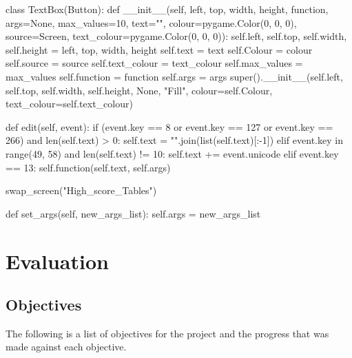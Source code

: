 \documentclass[fleqn]{article}
\begin{document}
\begin{python}
class TextBox(Button):
    def __init__(self, left, top, width, height, function, args=None, max_values=10, text="",
                 colour=pygame.Color(0, 0, 0), source=Screen, text_colour=pygame.Color(0, 0, 0)):
        self.left, self.top, self.width, self.height = left, top, width, height
        self.text = text
        self.Colour = colour
        self.source = source
        self.text_colour = text_colour
        self.max_values = max_values
        self.function = function
        self.args = args
        super().__init__(self.left, self.top, self.width, self.height, None, "Fill",
                         colour=self.Colour, text_colour=self.text_colour)

    def edit(self, event):
        if (event.key == 8 or event.key == 127 or event.key == 266) and len(self.text) > 0:
            self.text = "".join(list(self.text)[:-1])
        elif event.key in range(49, 58) and len(self.text) != 10:
            self.text += event.unicode
        elif event.key == 13:
            self.function(self.text, self.args)

            swap_screen("High_score_Tables")

    def set_args(self, new_args_list):
        self.args = new_args_list
\end{python}

\newpage
\section{Evaluation}

\subsection{Objectives}
The following is a list of objectives for the project and the progress that was made against each objective.
\end{document}

